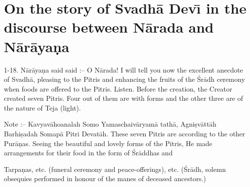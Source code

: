\chapter{On the story of Svadh\=a Dev\={\i} in the discourse between N\=arada and N\=ar\=aya\d{n}a}

1-18. N\=ar\=aya\d{n}a said said :-- O N\=arada! I will tell you now the excellent anecdote of Svadh\=a, pleasing to the Pitris and enhancing the fruits of the \'Sr\=adh ceremony when foods are offered to the Pitris. Listen. Before the creation, the Creator created seven Pitris. Four out of them are with forms and the other three are of the nature of Teja (light).

Note :-- Kavyav\=ahoanalah Somo Yamaschaiv\=aryam\=a tath\=a, Agni\d{s}v\=att\=ah Barhi\d{s}adah Somap\=a Pitri Devat\=ah. These seven Pitris are according to the other Pur\=a\d{n}as. Seeing the beautiful and lovely forms of the Pitris, He made arrangements for their food in the form of \'Sr\=addhas and

Tarpa\d{n}as, etc. (funeral ceremony and peace-offerings), etc. (\'Sr\=adh, solemn obsequies performed in honour of the manes of deceased ancestors.)

